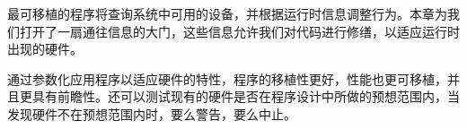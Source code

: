 
最可移植的程序将查询系统中可用的设备，并根据运行时信息调整行为。本章为我们打开了一扇通往信息的大门，这些信息允许我们对代码进行修缮，以适应运行时出现的硬件。\par

通过参数化应用程序以适应硬件的特性，程序的移植性更好，性能也更可移植，并且更具有前瞻性。还可以测试现有的硬件是否在程序设计中所做的预想范围内，当发现硬件不在预想范围内时，要么警告，要么中止。\par




\newpage